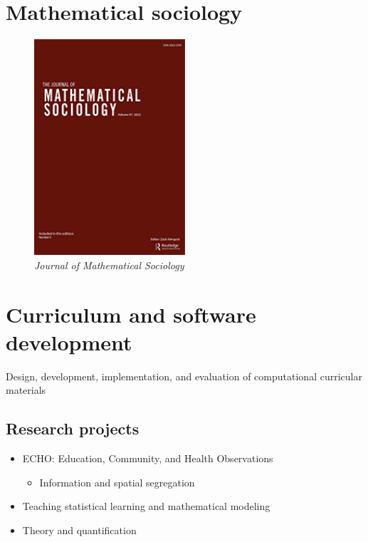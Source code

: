 \documentclass[
  letterpaper,
  DIV=11,
  numbers=noendperiod]{scrartcl}
\providecommand{\tightlist}{%
  \setlength{\itemsep}{0pt}\setlength{\parskip}{0pt}}\usepackage{longtable,booktabs,array}
\begin{document}
\hypertarget{mathematical-sociology}{%
\section{Mathematical sociology}\label{mathematical-sociology}}

\begin{figure}

{\centering \includegraphics[width=0.5\textwidth,height=\textheight]{math-soc.jpg}

}

\caption{\emph{Journal of Mathematical Sociology}}

\end{figure}

\hypertarget{curriculum-and-software-development}{%
\section{Curriculum and software
development}\label{curriculum-and-software-development}}

Design, development, implementation, and evaluation of computational
curricular materials

\hypertarget{research-projects}{%
\subsection{Research projects}\label{research-projects}}

\begin{itemize}
\item
  ECHO: Education, Community, and Health Observations

  \begin{itemize}
  \tightlist
  \item
    Information and spatial segregation
  \end{itemize}
\item
  Teaching statistical learning and mathematical modeling
\item
  Theory and quantification
\end{itemize}
\end{document}
